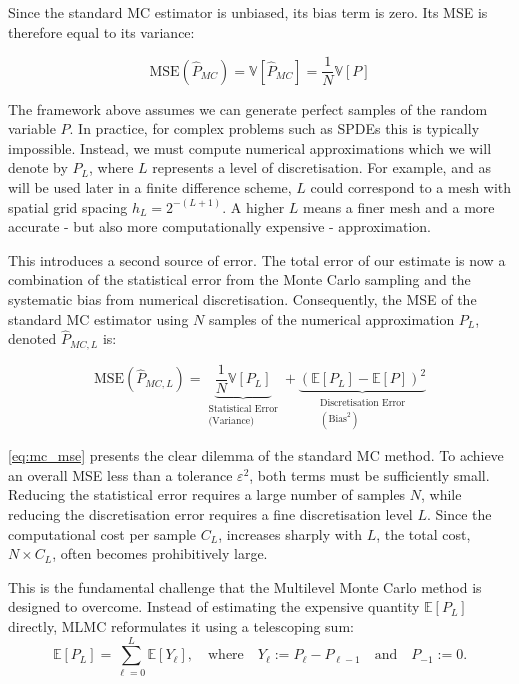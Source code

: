 Since the standard MC estimator is unbiased, its bias term is zero. 
Its MSE is therefore equal to its variance:

\begin{equation*}
    \text{MSE}(\hat{P}_{MC}) = \mathbb{V}[\hat{P}_{MC}] = \frac{1}{N}\mathbb{V}[P]
\end{equation*}

The framework above assumes we can generate perfect samples of the random 
variable $P$. In practice, for complex problems such as SPDEs this is typically impossible.
Instead, we must compute numerical approximations which we will denote by $P_L$, where $L$ 
represents a level of discretisation. For example, and as will be used later
in a finite difference scheme, $L$ could correspond to a mesh with spatial grid spacing 
$h_L = 2^{-(L+1)}$. A higher $L$ means a finer mesh and a more accurate - but also more 
computationally expensive - approximation. 

This introduces a second source of error. The total error of our estimate is now a combination 
of the statistical error from the Monte Carlo sampling and the systematic bias from
numerical discretisation. Consequently, the MSE of the standard MC estimator using 
$N$ samples of the numerical approximation $P_L$, denoted $\hat{P}_{MC, L}$ is:

\begin{equation}\label{eq:mc_mse}
    \text{MSE}(\hat{P}_{MC,L}) = \underbrace{\frac{1}{N}\mathbb{V}[P_L]}_{\substack{\text{Statistical Error} \\ \text{(Variance)}}} + 
    \underbrace{(\mathbb{E}[P_L] - \mathbb{E}[P])^2}_{\substack{\text{Discretisation Error} \\ (\text{Bias}^2)}}
\end{equation}

\eqref{eq:mc_mse} presents the clear dilemma of the standard MC method. To achieve an overall
MSE less than a tolerance  $\varepsilon^2$, both terms must be sufficiently small. 
Reducing the statistical error requires a large number of samples $N$, while 
reducing the discretisation error requires a fine discretisation level $L$.
Since the computational cost per sample $C_L$, increases sharply with $L$, the total 
cost, $N \times C_L$, often becomes prohibitively large. 

This is the fundamental challenge that the Multilevel Monte Carlo method is designed to overcome. 
Instead of estimating the expensive quantity $\mathbb{E}[P_L]$ directly, MLMC reformulates it 
using a telescoping sum:
\begin{equation*}
    \mathbb{E}[P_L] = \sum_{\ell=0}^L \mathbb{E}[Y_\ell], \quad \text{where} \quad 
    Y_\ell := P_\ell - P_{\ell-1} \quad \text{and} \quad P_{-1} := 0.
\end{equation*}

